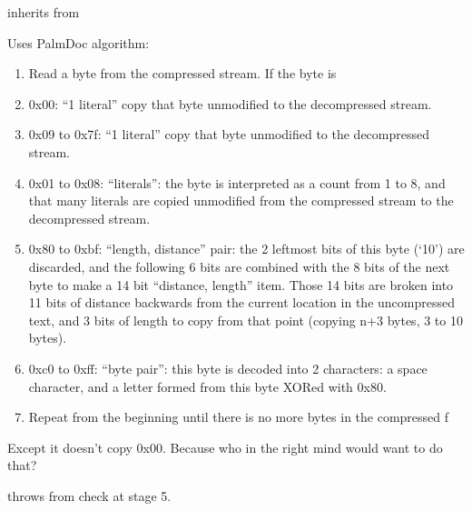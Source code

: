 \documentclass[letterpaper,10pt,english]{sphinxmanual}
\begin{document}
\begin{fulllineitems}
\label{compression:mobi::pd_compression}
inherits from {\hyperref[compression:mobi::compression]{}}

Uses PalmDoc algorithm:
\begin{enumerate}
\item {} 
Read a byte from the compressed stream. If the byte is

\item {} 
0x00: ``1 literal'' copy that byte unmodified to the decompressed stream.

\item {} 
0x09 to 0x7f: ``1 literal'' copy that byte unmodified to the decompressed stream.

\item {} 
0x01 to 0x08: ``literals'': the byte is interpreted as a count from 1 to 8, and that many literals are copied unmodified from the compressed stream to the decompressed stream.

\item {} 
0x80 to 0xbf: ``length, distance'' pair: the 2 leftmost bits of this byte (`10') are discarded, and the following 6 bits are combined with the 8 bits of the next byte to make a 14 bit ``distance, length'' item. Those 14 bits are broken into 11 bits of distance backwards from the current location in the uncompressed text, and 3 bits of length to copy from that point (copying n+3 bytes, 3 to 10 bytes).

\item {} 
0xc0 to 0xff: ``byte pair'': this byte is decoded into 2 characters: a space character, and a letter formed from this byte XORed with 0x80.

\item {} 
Repeat from the beginning until there is no more bytes in the compressed f

\end{enumerate}

Except it doesn't copy 0x00. Because who in the right mind would want to do that?

throws {\hyperref[exceptions:mobi::not_palmdoc_compression_exception]{}}
from check at stage 5.

\end{fulllineitems}

\end{document}
